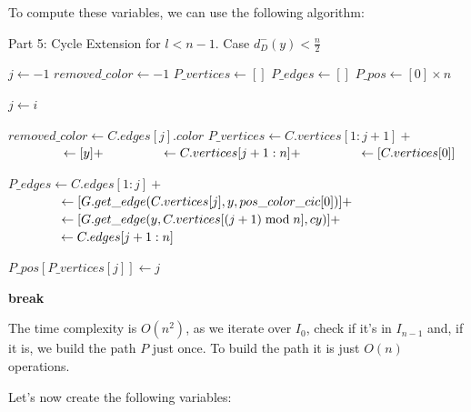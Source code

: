 To compute these variables, we can use the following algorithm:
\begin{algorithm}[H]
    \caption{Part 5: Cycle Extension for \( l < n - 1 \). Case \( d^-_D(y) < \frac{n}{2} \)}
    \begin{algorithmic}[1]
            \State $j \gets -1$
            \State $removed\_color \gets -1$
            \State $P\_vertices \gets []$
            \State $P\_edges \gets []$
            \State $P\_pos \gets [0] \times n$

                        \State \Return {}
                    \EndIf

                    \State $j \gets i$

                    \State $removed\_color \gets C.edges[j].color$
                    \State $P\_vertices \gets C.vertices[1:j+1] +$
                    \State $\hspace{4.3em} \gets [y] +$
                    \State $\hspace{4.3em} \gets C.vertices[j+1:n] +$
                    \State $\hspace{4.3em} \gets [C.vertices[0]]$

                    \State $P\_edges \gets C.edges[1:j] +$
                    \State $\hspace{4.1em} \gets [G.get\_edge(C.vertices[j], y, pos\_color\_cic[0])] +$
                    \State $\hspace{4.1em} \gets [G.get\_edge(y, C.vertices[(j + 1) \bmod n], cy)] +$
                    \State $\hspace{4.1em} \gets C.edges[j+1:n]$

                        \State $P\_pos[P\_vertices[j]] \gets j$
                    \EndFor

                    \State \textbf{break}
                \EndIf
            \EndFor
        \EndFunction
    \end{algorithmic}
\end{algorithm}

The time complexity is $O(n^2)$, as we iterate over $I_0$, check if it's in $I_{n-1}$ and, if it is, we build the path $P$ just once.
To build the path it is just $O(n)$ operations.

Let's now create the following variables:


